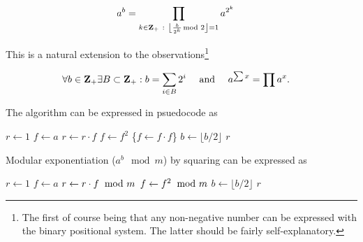 \vspace{-1em}
\[ \hspace*{-0.4cm}
    a^b =
    \prod_{k \in \textbf{Z}_{+} ~:~ \left \lfloor {b \over 2^k} \hspace*{-1ex} \mod 2 \right \rfloor = 1}
    a^{2^k}
\]

\noindent
This is a natural extension to the
observations\footnote{The first of course being
that any non-negative number can be expressed
with the binary positional system. The latter
should be fairly self-explanatory.}

\vspace{-1em}
\[ \hspace*{-0.4cm}
    \forall b \in \textbf{Z}_{+} \exists B \subset \textbf{Z}_{+} : b = \sum_{i \in B} 2^i
    ~~~~ \textrm{and} ~~~~
    a^{\sum x} = \prod a^x.
\]

\noindent
The algorithm can be expressed in psuedocode as

\vspace{1em}
\hspace{-2.8ex}
\begin{minipage}{\linewidth}
\begin{algorithmic}
    \STATE $r \gets 1$
    \STATE $f \gets a$
        \STATE $r \gets r \cdot f$
      \ENDIF
      \STATE $f \gets f^2$ \qquad \textcolor{c}{\{$f \gets f \cdot f$\}}
      \STATE $b \gets \lfloor b / 2 \rfloor$
    \ENDWHILE
    \RETURN $r$ 
\end{algorithmic}
\end{minipage}
\vspace{1em}

\noindent
Modular exponentiation ($a^b \mod m$) by squaring can be
expressed as

\vspace{1em}
\hspace{-2.8ex}
\begin{minipage}{\linewidth}
\begin{algorithmic}
    \STATE $r \gets 1$
    \STATE $f \gets a$
        \STATE $r \gets r \cdot f \hspace*{-1ex}~ \mod m$
      \ENDIF
      \STATE $f \gets f^2 \hspace*{-1ex}~ \mod m$
      \STATE $b \gets \lfloor b / 2 \rfloor$
    \ENDWHILE
    \RETURN $r$ 
\end{algorithmic}
\end{minipage}
\vspace{1em}

